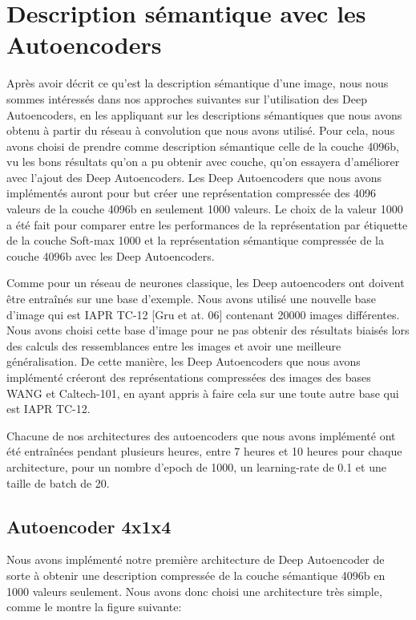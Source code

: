 \section{Description sémantique avec les Autoencoders}
	Après avoir décrit ce qu'est la description sémantique d'une image, nous nous sommes intéressés dans nos approches suivantes sur l'utilisation des Deep Autoencoders, en les appliquant sur les descriptions sémantiques que nous avons obtenu à partir du réseau à convolution que nous avons utilisé. Pour cela, nous avons choisi de prendre comme description sémantique celle de la couche 4096b, vu les bons résultats qu'on a pu obtenir avec couche, qu'on essayera d'améliorer avec l'ajout des Deep Autoencoders.
	Les Deep Autoencoders que nous avons implémentés auront pour but créer une représentation compressée des 4096 valeurs de la couche 4096b en seulement 1000 valeurs. Le choix de la valeur 1000 a été fait pour comparer entre les performances de la représentation par étiquette de la couche Soft-max 1000 et la représentation sémantique compressée de la couche 4096b avec les Deep Autoencoders.
	
	Comme pour un réseau de neurones classique, les Deep autoencoders ont doivent être entraînés sur une base d'exemple. Nous avons utilisé une nouvelle base d'image qui est IAPR TC-12 [Gru et at. 06] contenant 20000 images différentes. Nous avons choisi cette base d'image pour ne pas obtenir des résultats biaisés lors des calculs des ressemblances entre les images et avoir une meilleure généralisation. De cette manière, les Deep Autoencoders que nous avons implémenté créeront des représentations compressées des images des bases WANG et Caltech-101, en ayant appris à faire cela sur une toute autre base qui est IAPR TC-12.
	
	Chacune de nos architectures des autoencoders que nous avons implémenté ont été entraînées pendant plusieurs heures, entre 7 heures et 10 heures pour chaque architecture, pour un nombre d'epoch de 1000, un learning-rate de 0.1 et une taille de batch de 20.

\subsection{Autoencoder 4x1x4} 
	Nous avons implémenté notre première architecture de Deep Autoencoder de sorte à obtenir une description compressée de la couche sémantique 4096b en 1000 valeurs seulement. Nous avons donc choisi une architecture très simple, comme le montre la figure suivante:

